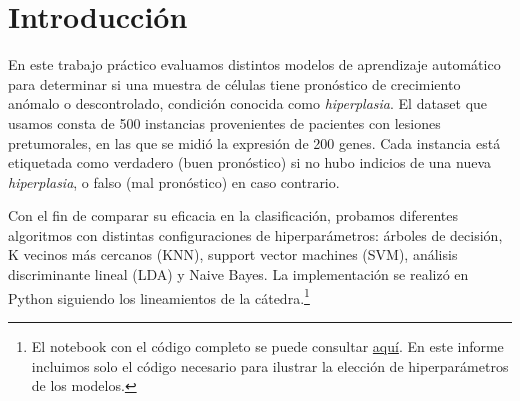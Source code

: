\documentclass[10pt,a4paper]{article}
\begin{document}

\fecha{\today}



\maketitle
\section{Introducción}
En este trabajo práctico evaluamos distintos modelos de aprendizaje automático para determinar si una muestra de células tiene pronóstico de crecimiento anómalo o descontrolado, condición conocida como \textit{hiperplasia}. El dataset que usamos consta de 500 instancias provenientes de pacientes con lesiones pretumorales, en las que se midió la expresión de 200 genes. Cada instancia está etiquetada como verdadero (buen pronóstico) si no hubo indicios de una nueva \textit{hiperplasia}, o falso (mal pronóstico) en caso contrario.

Con el fin de comparar su eficacia en la clasificación, probamos diferentes algoritmos con distintas configuraciones de hiperparámetros: árboles de decisión, K vecinos más cercanos (KNN), support vector machines (SVM), análisis discriminante lineal (LDA) y Naive Bayes. La implementación se realizó en Python siguiendo los lineamientos de la cátedra.\footnote{El notebook con el código completo se puede consultar \href{https://github.com/kissdelfina/aprendizaje-automatico/blob/main/Trabajo\%20Practico\%20I/TP_Aprendizaje_Automatico_I.ipynb}{aquí}. En este informe incluimos solo el código necesario para ilustrar la elección de hiperparámetros de los modelos.}
\end{document}
